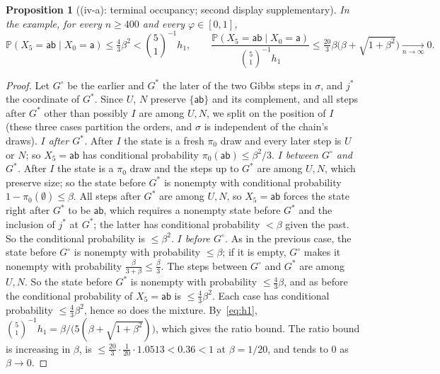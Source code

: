 \documentclass[11pt]{article}
\newtheorem{proposition}[theorem]{Proposition}
\theoremstyle{definition}
\renewcommand{\Pr}{\mathbb P}
\newcommand{\ph}{\varphi}
\newcommand{\sa}{\mathsf a}
\newcommand{\sab}{\mathsf{ab}}
\begin{document}
\begin{proposition}[(iv-a): terminal occupancy; second display supplementary]\label{prop:end}
In the example, for every $n\ge400$ and every $\ph\in[0,1]$,
\[
\Pr(X_5=\sab\mid X_0=\sa)\le\tfrac43\beta^2<\binom51^{-1}h_1,\qquad
\frac{\Pr(X_5=\sab\mid X_0=\sa)}{\binom51^{-1}h_1}\le\tfrac{20}{3}\beta\big(\beta+\sqrt{1+\beta^2}\big)\xrightarrow[n\to\infty]{}0 .
\]
\end{proposition}
\begin{proof}
Let $G^\circ$ be the earlier and $G^*$ the later of the two Gibbs steps in $\sigma$, and $j^*$ the coordinate of $G^*$. Since $U$, $N$ preserve $\{\sab\}$ and its complement, and all steps after $G^*$ other than possibly $I$ are among $U,N$, we split on the position of $I$ (these three cases partition the orders, and $\sigma$ is independent of the chain's draws).
\emph{$I$ after $G^*$.} After $I$ the state is a fresh $\pi_0$ draw and every later step is $U$ or $N$; so $X_5=\sab$ has conditional probability $\pi_0(\sab)\le\beta^2/3$.
\emph{$I$ between $G^\circ$ and $G^*$.} After $I$ the state is a $\pi_0$ draw and the steps up to $G^*$ are among $U,N$, which preserve size; so the state before $G^*$ is nonempty with conditional probability $1-\pi_0(\emptyset)\le\beta$. All steps after $G^*$ are among $U,N$, so $X_5=\sab$ forces the state right after $G^*$ to be $\sab$, which requires a nonempty state before $G^*$ and the inclusion of $j^*$ at $G^*$; the latter has conditional probability $<\beta$ given the past. So the conditional probability is $\le\beta^2$.
\emph{$I$ before $G^\circ$.} As in the previous case, the state before $G^\circ$ is nonempty with probability $\le\beta$; if it is empty, $G^\circ$ makes it nonempty with probability $\frac\beta{3+\beta}\le\frac\beta3$. The steps between $G^\circ$ and $G^*$ are among $U,N$. So the state before $G^*$ is nonempty with probability $\le\frac43\beta$, and as before the conditional probability of $X_5=\sab$ is $\le\frac43\beta^2$.
Each case has conditional probability $\le\frac43\beta^2$, hence so does the mixture. By~\eqref{eq:h1}, $\binom51^{-1}h_1=\beta/\big(5(\beta+\sqrt{1+\beta^2})\big)$, which gives the ratio bound. The ratio bound is increasing in $\beta$, is $\le\frac{20}{3}\cdot\frac1{20}\cdot1.0513<0.36<1$ at $\beta=1/20$, and tends to $0$ as $\beta\to0$.
\end{proof}
\end{document}
